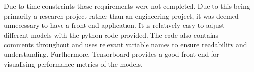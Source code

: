 Due to time constraints these requirements were not completed. Due to this being primarily a research project
rather than an engineering project, it was deemed unnecessary to have a front-end application. It is relatively
easy to adjust different models with the python code provided. The code also contains comments throughout and uses
relevant variable names to ensure readability and understanding. Furthermore, Tensorboard provides a good front-end
for visualising performance metrics of the models.